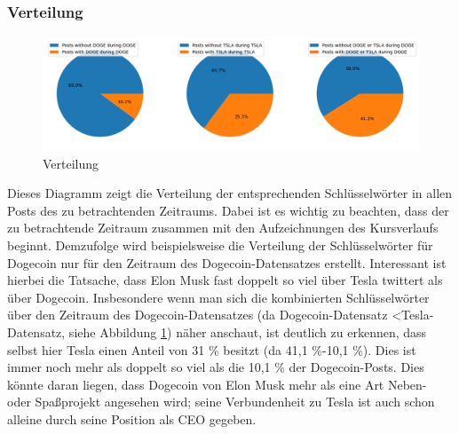 \documentclass{article}
\begin{document}
\subsubsection{Verteilung} \label{Verteilung}
\begin{figure}[h]
  	\centering
  	\includegraphics[width=\textwidth]{../imgs/Verteilung.png}
 	\caption{Verteilung}
 	\label{fig:Verteilung}
\end{figure}
Dieses Diagramm zeigt die Verteilung der entsprechenden Schlüsselwörter in allen Posts des zu betrachtenden Zeitraums.
Dabei ist es wichtig zu beachten, dass der zu betrachtende Zeitraum zusammen mit den Aufzeichnungen des Kursverlaufs beginnt.
Demzufolge wird beispielsweise die Verteilung der Schlüsselwörter für Dogecoin nur für den Zeitraum des Dogecoin-Datensatzes erstellt.
Interessant ist hierbei die Tatsache, dass Elon Musk fast doppelt so viel über Tesla twittert als über Dogecoin.
Insbesondere wenn man sich die kombinierten Schlüsselwörter über den Zeitraum des Dogecoin-Datensatzes (da Dogecoin-Datensatz \textless Tesla-Datensatz, siehe Abbildung \ref{fig:Verteilung}) näher anschaut, ist deutlich zu erkennen, dass selbst hier Tesla einen Anteil von 31 \% besitzt (da 41,1 \%-10,1 \%).
Dies ist immer noch mehr als doppelt so viel als die 10,1 \% der Dogecoin-Posts.
Dies könnte daran liegen, dass Dogecoin von Elon Musk mehr als eine Art Neben- oder Spaßprojekt angesehen wird; seine Verbundenheit zu Tesla ist auch schon alleine durch seine Position als CEO gegeben.
\end{document}
